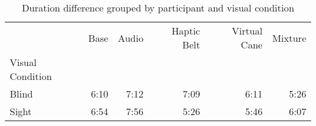 
\begin{table}[!htb]
\centering
\caption{Duration difference grouped by participant and visual condition}
\label{tab:duracao_min_average_group}
\begin{tabular}{lrrrrr}
\toprule
{} &  Base & Audio & Haptic Belt & Virtual Cane & Mixture \\
Visual Condition &       &       &             &              &         \\
\midrule
Blind            &  6:10 &  7:12 &        7:09 &         6:11 &    5:26 \\
Sight            &  6:54 &  7:56 &        5:26 &         5:46 &    6:07 \\
\bottomrule
\end{tabular}
\end{table}

